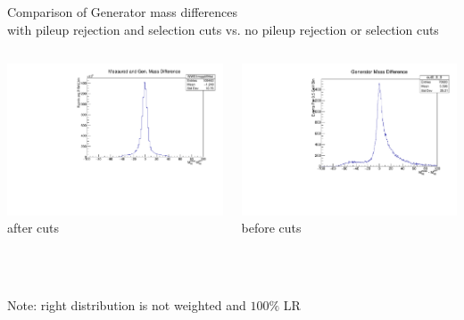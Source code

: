 \documentclass[10pt]{beamer}
\begin{document}
\begin{frame}
Comparison of Generator mass differences\\
with pileup rejection and selection cuts vs. no pileup rejection or selection cuts
\scriptsize
\begin{columns}
\begin{column}{0.5\textwidth}
\includegraphics[scale=0.3, left]{mqqdiffHist.pdf} \\
 after cuts
\end{column}
\begin{column}{0.5\textwidth}
\includegraphics[scale=0.28, left]{nocutDiff.pdf} \\
before cuts
\end{column}
\end{columns}
\quad \quad \\
\quad \quad \\
Note: right distribution is not weighted and $100\%$ LR

\end{frame}
\end{document}
